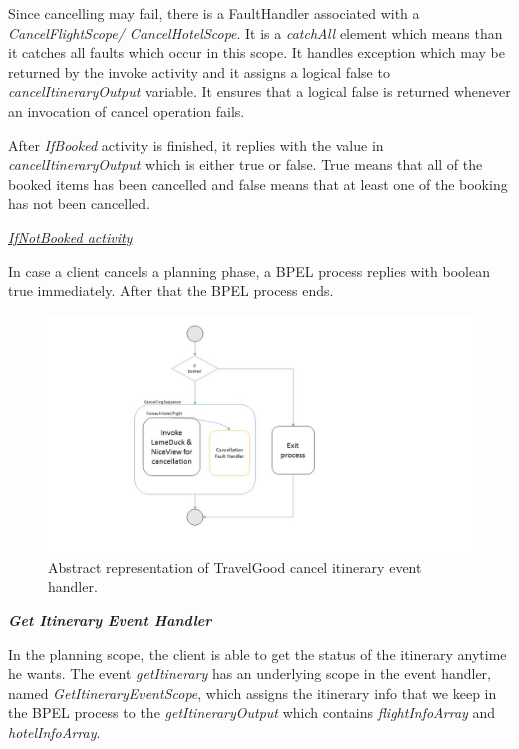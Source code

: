 Since cancelling may fail, there is a FaultHandler associated with a \textit{CancelFlightScope/ CancelHotelScope}. It is a \textit{catchAll} element which means than it catches all faults which occur in this scope. It handles exception which may be returned by the invoke activity and it assigns a logical false to \textit{cancelItineraryOutput} variable. It ensures that a logical false is returned whenever an invocation of cancel operation fails. 

After \textit{IfBooked} activity is finished, it replies with the value in \textit{cancelItineraryOutput} which is either true or false. True means that all of the booked items has been cancelled and false means that at least one of the booking has not been cancelled.

\underline{\textit{IfNotBooked activity}}

In case a client cancels a planning phase, a BPEL process replies with boolean true immediately. After that the BPEL process ends.

\begin{figure}[H]
\centering
\includegraphics[width=\textwidth]{images/bpel_cancel_abstract_impl.jpg}
\caption{Abstract representation of TravelGood cancel itinerary event handler.} \label{fig:abstract-cancel}
\label{statediagram}
\end{figure}

\textbf{\textit{Get Itinerary Event Handler}}

In the planning scope, the client is able to get the status of the itinerary anytime he wants. The event \textit{getItinerary} has an underlying scope in the event handler, named \textit{GetItineraryEventScope}, which assigns the itinerary info that we keep in the BPEL process to the \textit{getItineraryOutput} which contains \textit{flightInfoArray} and \textit{hotelInfoArray}.


